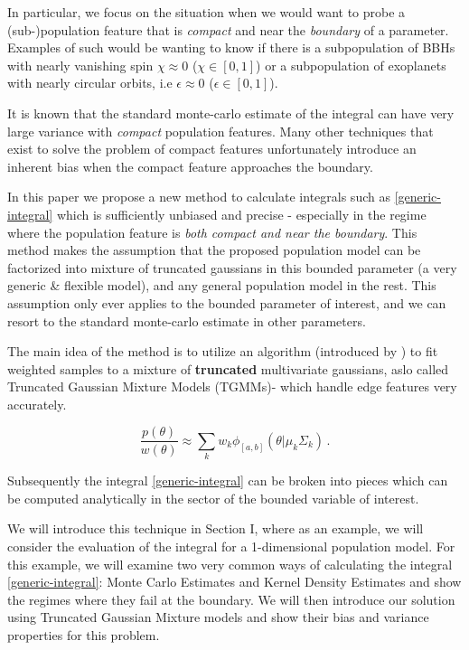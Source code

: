\documentclass[twocolumn,usenames,dvipsnames,linenumbers]{aastex631}
\begin{document}
In particular, we focus on the situation when we would want to probe a (sub-)population feature that is \textit{compact} and near the \textit{boundary} of a parameter. Examples of such would be wanting to know if there is a subpopulation of BBHs with nearly vanishing spin $\chi \approx 0$ ($\chi \in [0,1]$) or a subpopulation of exoplanets with nearly circular orbits, i.e $\epsilon \approx 0$ ($\epsilon \in [0,1]$).

It is known that the standard monte-carlo estimate of the integral can have very large variance with \textit{compact} population features. Many other techniques that exist to solve the problem of compact features unfortunately introduce an inherent bias when the compact feature approaches the boundary. 

In this paper we propose a new method to calculate integrals such as \eqref{generic-integral} which is sufficiently unbiased and precise - especially in the regime where the population feature is \textit{both compact and near the boundary}. This method makes the assumption that the proposed population model can be factorized into mixture of truncated gaussians in this bounded parameter (a very generic \& flexible model), and any general population model in the rest. This assumption only ever applies to the bounded parameter of interest, and we can resort to the standard monte-carlo estimate in other parameters.

The main idea of the method is to utilize an algorithm (introduced by \cite{Lee2012}) to fit weighted samples to a mixture of \textbf{truncated} multivariate gaussians, aslo called Truncated Gaussian Mixture Models (TGMMs)- which handle edge features very accurately. 

\begin{equation}
	\frac{p(\theta)}{w(\theta)} \approx \sum_k w_k \phi_{[a,b]}(\theta | \mu_k \Sigma_k)\, .
\end{equation}

Subsequently the integral \eqref{generic-integral} can be broken into pieces which can be computed analytically in the sector of the bounded variable of interest.

We will introduce this technique in Section I, where as an example, we will consider the evaluation of the integral for a 1-dimensional population model.
For this example, we will examine two very common ways of calculating the integral \eqref{generic-integral}: Monte Carlo Estimates and Kernel Density Estimates and show the regimes where they fail at the boundary. We will then introduce our solution using Truncated Gaussian Mixture models and show their bias and variance properties for this problem. 
\end{document}
